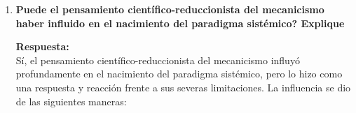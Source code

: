 \documentclass[12pt,a4paper]{article}
\begin{document}
\begin{enumerate}[label=\textbf{Pregunta \arabic*.}]
\begin{enumerate}
\begin{itemize}
                        \item \textbf{Adquisición de información:} la incertidumbre en una organización se combate con información. La Teoría de la Información establece que la información es matemáticamente isomórfica (equivalente) a la neguentropía; es decir, la información es una medida de organización. Por lo tanto, la información actúa como un ``agente neguentrópico'' directo: mientras más información reciba y procese la organización sobre su entorno y sus propios resultados, menor será su incertidumbre y mayor será su capacidad para mantenerse organizada y estable.
                    \end{itemize}

          \end{enumerate}

    \item   \textbf{Puede el pensamiento científico-reduccionista del mecanicismo haber influido en el
              nacimiento del paradigma sistémico? Explique}

          \textbf{Respuesta:} \\
          Sí, el pensamiento científico-reduccionista del mecanicismo influyó profundamente en el nacimiento del paradigma sistémico, pero lo hizo como una respuesta y reacción frente a sus severas limitaciones.
          La influencia se dio de las siguientes maneras:


\end{enumerate}
\end{document}
